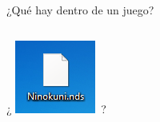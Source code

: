 \begin{frame}{¿Qué hay dentro de un juego?}
    \fontsize{45}{0}\selectfont
    \begin{columns}
    \begin{column}{0.70\textwidth}
        ¿ \includegraphics{imgs/gamefile.png}~?
    \end{column}
    \begin{column}{0.30\textwidth}
    \end{column}
    \end{columns}
\end{frame}

